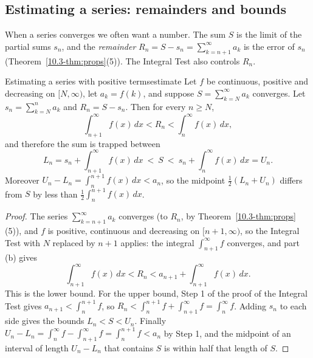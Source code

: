 \documentclass[11pt]{article}
\begin{document}
\subsection*{Estimating a series: remainders and bounds}

When a series converges we often want a number. The sum $S$ is the limit of the partial sums $s_n$, and the \emph{remainder} $R_n=S-s_n=\sum_{k=n+1}^\infty a_k$ is the error of $s_n$ (Theorem~\ref{10.3-thm:props}(5)). The Integral Test also controls $R_n$.

\begin{thm}{Estimating a series with positive terms}{estimate}
Let $f$ be continuous, positive and decreasing on $[N,\infty)$, let $a_k=f(k)$, and suppose $S=\sum_{k=N}^\infty a_k$ converges. Let $s_n=\sum_{k=N}^na_k$ and $R_n=S-s_n$. Then for every $n\ge N$,
\[
\int_{n+1}^\infty f(x)\,dx<R_n<\int_n^\infty f(x)\,dx,
\]
and therefore the sum is trapped between
\[
L_n=s_n+\int_{n+1}^\infty f(x)\,dx\ <\ S\ <\ s_n+\int_n^\infty f(x)\,dx=U_n .
\]
Moreover $U_n-L_n=\displaystyle\int_n^{n+1}f(x)\,dx<a_n$, so the midpoint $\frac12(L_n+U_n)$ differs from $S$ by less than $\frac12\displaystyle\int_n^{n+1}f(x)\,dx$.
\end{thm}
\begin{proof}
The series $\sum_{k=n+1}^\infty a_k$ converges (to $R_n$, by Theorem~\ref{10.3-thm:props}(5)), and $f$ is positive, continuous and decreasing on $[n+1,\infty)$, so the Integral Test with $N$ replaced by $n+1$ applies: the integral $\int_{n+1}^\infty f$ converges, and part (b) gives
\[
\int_{n+1}^\infty f(x)\,dx<R_n<a_{n+1}+\int_{n+1}^\infty f(x)\,dx .
\]
This is the lower bound. For the upper bound, Step 1 of the proof of the Integral Test gives $a_{n+1}<\int_n^{n+1}f$, so $R_n<\int_n^{n+1}f+\int_{n+1}^\infty f=\int_n^\infty f$. Adding $s_n$ to each side gives the bounds $L_n<S<U_n$. Finally $U_n-L_n=\int_n^\infty f-\int_{n+1}^\infty f=\int_n^{n+1}f<a_n$ by Step 1, and the midpoint of an interval of length $U_n-L_n$ that contains $S$ is within half that length of $S$.
\end{proof}
\end{document}
